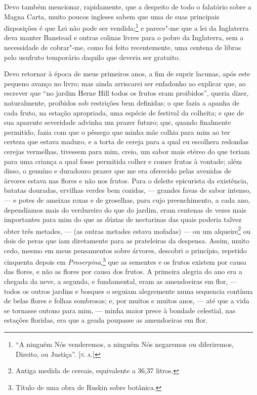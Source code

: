 Devo também mencionar, rapidamente, que a despeito de todo o falatório
sobre a Magna Carta, muito poucos ingleses sabem que uma de suas
principais disposições é que Lei não pode ser vendida;\footnote{``A
  ninguém Nós venderemos, a ninguém Nós negaremos ou diferiremos,
  Direito, ou Justiça''. {[}\textsc{n.\,a.}{]}} e parece"-me que a lei da
Inglaterra deva manter Banstead e outras colinas livres para o pobre da
Inglaterra, sem a necessidade de cobrar"-me, como foi feito recentemente,
uma centena de libras pelo usufruto temporário daquilo que deveria ser
gratuito.

Devo retornar à época de meus primeiros anos, a fim de suprir
lacunas, após este pequeno avanço no livro; mas ainda arriscarei ser
enfadonho ao explicar que, ao escrever que ``no jardim Herne Hill todos
os frutos eram proibidos'', queria dizer, naturalmente, proibidos sob
restrições bem definidas; o que fazia a apanha de cada fruto, na estação
apropriada, uma espécie de festival da colheita; e que de sua aparente
severidade advinha um prazer futuro; que, quando finalmente permitido,
fazia com que o pêssego que minha mãe colhia para mim ao ter certeza que
estava maduro, e a torta de cereja para a qual eu escolhera redondas
cerejas vermelhas, tivessem para mim, creio, um sabor mais etéreo do que
teriam para uma criança a qual fosse permitida colher e comer frutas à
vontade; além disso, o genuíno e duradouro prazer que me era oferecido
pelas avenidas de árvores estava nas flores e não nos frutos. Para o
deleite epicurista da existência, batatas douradas, ervilhas verdes bem
cozidas, --- grandes favas de sabor intenso, --- e potes de ameixas roxas
e de groselhas, para cujo preenchimento, a cada ano, dependíamos mais do
verdureiro do que do jardim, eram centenas de vezes mais importantes
para mim do que as dúzias de nectarinas das quais poderia talvez obter
três metades, --- (as outras metades estava mofadas) --- ou um
alqueire\footnote{Antiga medida de cereais, equivalente a 36,37 litros.} ou dois de peras que iam diretamente para as
prateleiras da despensa. Assim, muito cedo, mesmo em meus pensamentos
sobre árvores, descobri o princípio, repetido cinquenta depois em
\textit{Proserpina},\footnote{Título de uma obra de Ruskin sobre botânica.} que as sementes e os frutos existem por causa das
flores, e não as flores por causa dos frutos. A primeira alegria do ano
era a chegada da neve, a segunda, e fundamental, eram as amendoeiras em
flor, --- todos os outros jardins e bosques o seguiam alegremente numa
sequencia contínua de belas flores e folhas sombrosas; e, por muitos e
muitos anos, --- até que a vida se tornasse outono para mim, --- minha
maior prece à bondade celestial, nas estações floridas, era que a geada
poupasse as amendoeiras em flor.

